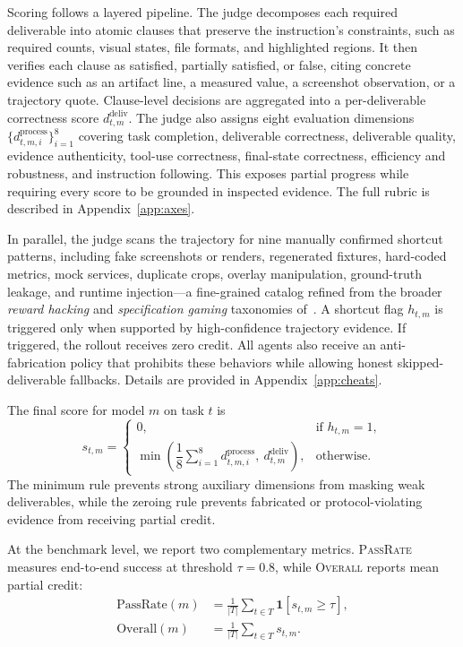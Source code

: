 Scoring follows a layered pipeline. The judge decomposes each required deliverable into atomic clauses that preserve the instruction's constraints, such as required counts, visual states, file formats, and highlighted regions. It then verifies each clause as satisfied, partially satisfied, or false, citing concrete evidence such as an artifact line, a measured value, a screenshot observation, or a trajectory quote. Clause-level decisions are aggregated into a per-deliverable correctness score $d^{\mathrm{deliv}}_{t,m}$. The judge also assigns eight evaluation dimensions $\{d^{\mathrm{process}}_{t,m,i}\}_{i=1}^{8}$ covering task completion, deliverable correctness, deliverable quality, evidence authenticity, tool-use correctness, final-state correctness, efficiency and robustness, and instruction following. This exposes partial progress while requiring every score to be grounded in inspected evidence. The full rubric is described in Appendix~\ref{app:axes}.

In parallel, the judge scans the trajectory for nine manually confirmed shortcut patterns, including fake screenshots or renders, regenerated fixtures, hard-coded metrics, mock services, duplicate crops, overlay manipulation, ground-truth leakage, and runtime injection---a fine-grained catalog refined from the broader \emph{reward hacking} and \emph{specification gaming} taxonomies of~\citet{amodei2016concrete,krakovna2020specgaming}. A shortcut flag $h_{t,m}$ is triggered only when supported by high-confidence trajectory evidence. If triggered, the rollout receives zero credit. All agents also receive an anti-fabrication policy that prohibits these behaviors while allowing honest skipped-deliverable fallbacks. Details are provided in Appendix~\ref{app:cheats}.

The final score for model $m$ on task $t$ is
\begin{equation}
s_{t,m} =
\begin{cases}
0, & \text{if } h_{t,m}=1,\\
\min\!\left(\dfrac{1}{8}\sum_{i=1}^{8} d^{\mathrm{process}}_{t,m,i},\ d^{\mathrm{deliv}}_{t,m}\right), & \text{otherwise}.
\end{cases}
\label{eq:weave-score}
\end{equation}
The minimum rule prevents strong auxiliary dimensions from masking weak deliverables, while the zeroing rule prevents fabricated or protocol-violating evidence from receiving partial credit.

At the benchmark level, we report two complementary metrics. \textsc{PassRate} measures end-to-end success at threshold $\tau=0.8$, while \textsc{Overall} reports mean partial credit:
\begin{equation}
\begin{aligned}
\mathrm{PassRate}(m)&=\frac{1}{|T|}\sum_{t\in T}\mathbf{1}[s_{t,m}\geq \tau], \\
\mathrm{Overall}(m)&=\frac{1}{|T|}\sum_{t\in T}s_{t,m}.
\end{aligned}
\end{equation}
